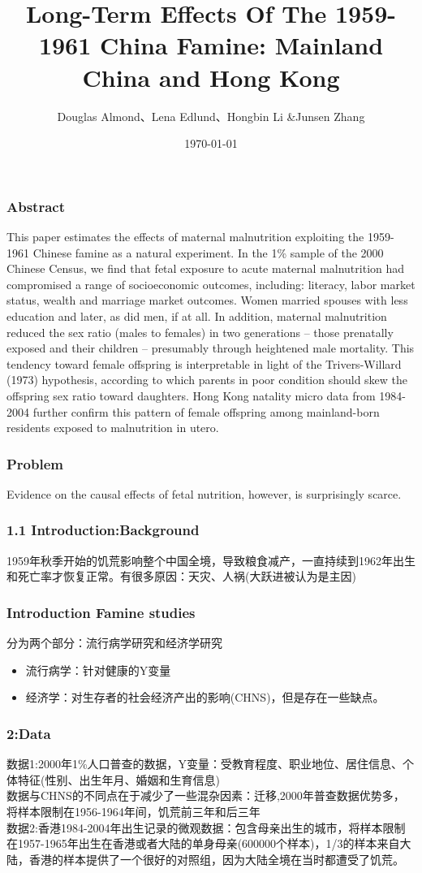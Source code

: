 \documentclass{beamer}
\title[文献分享:ZY]{Long-Term Effects Of The 1959-1961 China Famine: Mainland China and Hong Kong}
\author[Famine\_workshop]{Douglas Almond、Lena Edlund、Hongbin Li \&Junsen Zhang}
\date{\today}
\begin{document}
\frame{\titlepage}


\begin{frame}
	\frametitle{Abstract}
This paper estimates the effects of maternal malnutrition exploiting the 1959-1961 Chinese famine as a natural experiment. In the 1\% sample of the 2000 Chinese Census, we find that fetal exposure to acute maternal malnutrition had compromised a range of socioeconomic outcomes, including: literacy, labor market status, wealth and marriage market outcomes. Women married spouses with less education and later, as did men, if at all. In addition, maternal malnutrition reduced the sex ratio (males to females) in two generations -- those prenatally exposed and their children -- presumably through heightened male mortality. This tendency toward female offspring is interpretable in light of the Trivers-Willard (1973) hypothesis, according to which parents in poor condition should skew the offspring sex ratio toward daughters. Hong Kong natality micro data from 1984-2004 further confirm this pattern of female offspring among mainland-born residents exposed to malnutrition in utero.
\end{frame}

\begin{frame}
	\frametitle{Problem}
Evidence on the causal eﬀects of fetal nutrition, however, is surprisingly scarce.

\end{frame}


\begin{frame}
	\frametitle{1.1 Introduction:Background}
1959年秋季开始的饥荒影响整个中国全境，导致粮食减产，一直持续到1962年出生和死亡率才恢复正常。有很多原因：天灾、人祸(大跃进被认为是主因)

\end{frame}


\begin{frame}
	\frametitle{Introduction Famine studies}
	分为两个部分：流行病学研究和经济学研究
	\begin{itemize}
		\item 流行病学：针对健康的Y变量
		\item 经济学：对生存者的社会经济产出的影响(CHNS)，但是存在一些缺点。
	\end{itemize}
\end{frame}


\begin{frame}
	\frametitle{2:Data}
	数据1:2000年1\%人口普查的数据，Y变量：受教育程度、职业地位、居住信息、个体特征(性别、出生年月、婚姻和生育信息)
	\\数据与CHNS的不同点在于减少了一些混杂因素：迁移,2000年普查数据优势多，将样本限制在1956-1964年间，饥荒前三年和后三年
	\\数据2:香港1984-2004年出生记录的微观数据：包含母亲出生的城市，将样本限制在1957-1965年出生在香港或者大陆的单身母亲(600000个样本)，1/3的样本来自大陆，香港的样本提供了一个很好的对照组，因为大陆全境在当时都遭受了饥荒。
\end{frame}
\end{document}
